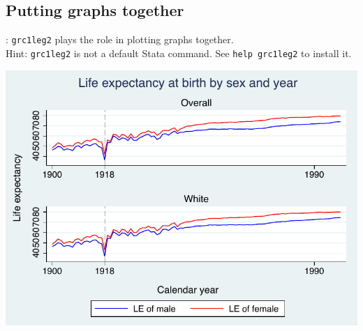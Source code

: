 \subsection{Putting graphs together}
\begin{frame}[fragile]{\secname: \subsecname}
\verb|grc1leg2| plays the role in plotting graphs together. \\
Hint: \verb|grc1leg2| is not a default Stata command. See \verb|help grc1leg2| to install it.
\begin{center}
	\includegraphics[scale=0.5]{images/grc1leg2}
\end{center}
\end{frame}

